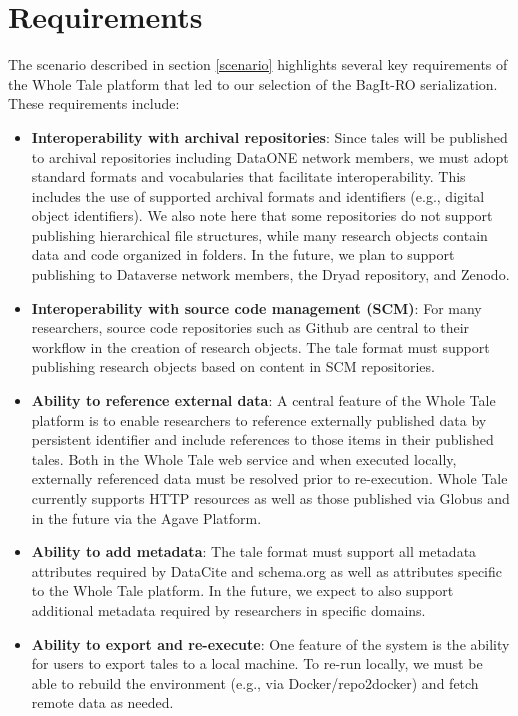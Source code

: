 \documentclass[conference]{IEEEtran}
\begin{document}
\section{Requirements}  \label{requirements}
The scenario described in section \ref{scenario} highlights several key requirements of the 
Whole Tale platform that led to our selection of the BagIt-RO serialization.  These requirements include:

\begin{itemize}
\item{{\bf Interoperability with archival repositories}: Since tales will be published to archival repositories including DataONE network members, we must adopt standard formats and vocabularies that facilitate interoperability. This includes the use of supported archival formats and identifiers (e.g., digital object identifiers). We also note here that some repositories do not support publishing hierarchical file structures, while many research objects contain data and code organized in folders. In the future, we plan to support publishing to Dataverse network members, the Dryad repository, and Zenodo.}
\item{{\bf Interoperability with source code management (SCM)}: For many researchers, source code repositories such as Github are central to their workflow in the creation of research objects. The tale format must support publishing research objects based on content in SCM repositories.}
\item{{\bf Ability to reference external data}: A central feature of the Whole Tale platform is to enable researchers to reference externally published data by persistent identifier and include references to those items in their published tales. Both in the Whole Tale web service and when executed locally, externally referenced data must be resolved prior to re-execution. Whole Tale currently supports HTTP resources as well as those published via Globus and in the future via the Agave Platform.}
\item{{\bf Ability to add metadata}: The tale format must support all metadata attributes required by DataCite and schema.org as well as attributes specific to the Whole Tale platform. In the future, we expect to also support additional metadata required by researchers in specific domains.}
\item{{\bf Ability to export and re-execute}: One feature of the system is the ability for users to export tales to a local machine. To re-run locally, we must be able to rebuild the environment (e.g., via Docker/repo2docker) and fetch remote data as needed.}

\end{itemize}
\end{document}
